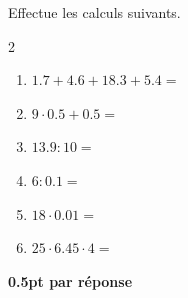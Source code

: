 
\question[3]
Effectue les calculs suivants.	

\vspace{10pt}
\setlength{\columnsep}{50pt}
\begin{multicols}{2}
\begin{enumerate}[leftmargin=*,align=parleft, label=\alph*), itemsep=25pt]
\item $1.7 + 4.6 + 18.3 + 5.4 =$ 
\item $9 \cdot 0.5 + 0.5 =$ 
\item $13.9 : 10 =$ 
\item $6 : 0.1 =$ 
\item $18 \cdot 0.01 =$ 
\item $25 \cdot 6.45 \cdot 4 =$ 
\end{enumerate}
\end{multicols}
\setlength{\columnsep}{10pt}

\begin{solution}[0pt]
\textbf{0.5pt par réponse}
\end{solution}